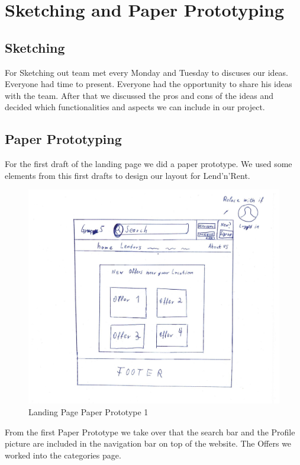 \section{Sketching and Paper Prototyping}

    \subsection{Sketching}
        For Sketching out team met every Monday and Tuesday to discuses our ideas. Everyone had time to present. Everyone had the opportunity to share his ideas with the team. After that we discussed the pros and cons of the ideas and decided which functionalities and aspects we can include in our project.
        
    \subsection{Paper Prototyping}
        For the first draft of the landing page we did a paper prototype. We used some elements from this first drafts to design our layout for Lend'n'Rent.
        
        	\begin{figure}[H]
				\centering
				\includegraphics[width=\linewidth]{src/abb/6_Sketching and Paper Prototyping/Homepage1.png}
				\caption{Landing Page Paper Prototype 1}
				\label{fig:Homepage1}
			\end{figure}
			
			\noindent
			From the first Paper Prototype we take over that the search bar and the Profile picture are included in the navigation bar on top of the website. The Offers we worked into the categories page. 
			
